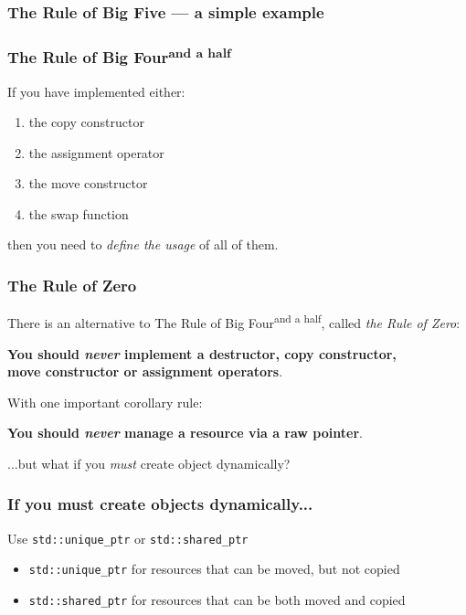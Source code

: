 \documentclass[aspectratio=169]{beamer}
\newcommand{\greenemph}[1]{\textit{\textcolor{clGreen}{#1}}}
\begin{document}
\begin{frame}
\frametitle{The Rule of Big Five --- a simple example}
\begin{multicols}{2}
  {\fontsize{4}{4} }
\end{multicols}
\end{frame}

\begin{frame}
\frametitle{The Rule of Big Four\textsuperscript{and a half}}
If you have implemented either:
\begin{enumerate}
\item{the copy constructor}
\item{the assignment operator}
\item{the move constructor}
\item{the swap function}
\end{enumerate}
then you need to  \greenemph{define the usage} of all of them.
\end{frame}

\begin{frame}
\frametitle{The Rule of Zero}
There is an alternative to \textcolor{clViolet}{The Rule of Big Four\textsuperscript{and a half}}, called \greenemph{the Rule of Zero}:\\
\begin{center}
\textbf{You should \emph{never} implement a destructor, copy constructor,\\move constructor or assignment operators}.
\end{center}
With one important corollary rule:
\begin{center}
\textbf{You should \emph{never} manage a resource via a raw pointer}.
\end{center}
\vspace{1cm}
...but what if you \emph{must} create object dynamically?
\end{frame}

\begin{frame}
\frametitle{If you must create objects dynamically...}
Use \texttt{std::unique\_ptr} or \texttt{std::shared\_ptr}
\begin{itemize}
\item{\texttt{std::unique\_ptr} for resources that can be \textcolor{clGreen}{moved}, but not \textcolor{clRedFlag}{copied}}
\item{\texttt{std::shared\_ptr} for resources that can be both \textcolor{clGreen}{moved} and \textcolor{clGreen}{copied}}
\end{itemize}
\end{frame}
\end{document}
